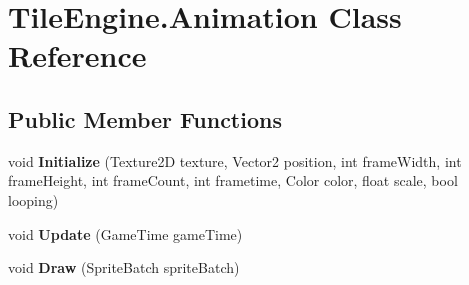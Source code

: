 \hypertarget{class_tile_engine_1_1_animation}{\section{Tile\-Engine.\-Animation Class Reference}
\label{class_tile_engine_1_1_animation}
}
\subsection*{Public Member Functions}
\begin{DoxyCompactItemize}
\item 
\hypertarget{class_tile_engine_1_1_animation_a92f73196e610356a0810345fe97b026d}{void {\bfseries Initialize} (Texture2\-D texture, Vector2 position, int frame\-Width, int frame\-Height, int frame\-Count, int frametime, Color color, float scale, bool looping)}\label{class_tile_engine_1_1_animation_a92f73196e610356a0810345fe97b026d}

\item 
\hypertarget{class_tile_engine_1_1_animation_a2614c6eff471aecefade8b906a489eeb}{void {\bfseries Update} (Game\-Time game\-Time)}\label{class_tile_engine_1_1_animation_a2614c6eff471aecefade8b906a489eeb}

\item 
\hypertarget{class_tile_engine_1_1_animation_ab4dd3a8d57cc8de71f8863ff91238eea}{void {\bfseries Draw} (Sprite\-Batch sprite\-Batch)}\label{class_tile_engine_1_1_animation_ab4dd3a8d57cc8de71f8863ff91238eea}

\end{DoxyCompactItemize}
